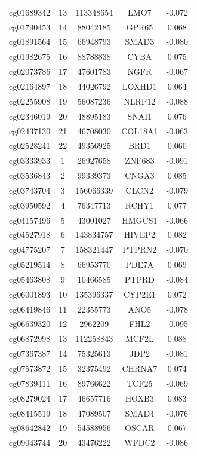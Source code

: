 \documentclass[12pt,a4paper]{article}
\begin{document}
\begin{longtable}{|c|c|c|c|c|}
		cg01689342 & 13 & 113348654 & LMO7 & -0.072 \\
		cg01790453 & 14 & 88042185 & GPR65 & 0.068 \\
		cg01891564 & 15 & 66948793 & SMAD3 & -0.080 \\
		cg01982675 & 16 & 88788838 & CYBA & 0.075 \\
		cg02073786 & 17 & 47601783 & NGFR & -0.067 \\
		cg02164897 & 18 & 44026792 & LOXHD1 & 0.064 \\
		cg02255908 & 19 & 56087236 & NLRP12 & -0.088 \\
		cg02346019 & 20 & 48895183 & SNAI1 & 0.076 \\
		cg02437130 & 21 & 46708030 & COL18A1 & -0.063 \\
		cg02528241 & 22 & 49356925 & BRD1 & 0.060 \\
		cg03333933 & 1 & 26927658 & ZNF683 & -0.091 \\
		cg03536843 & 2 & 99339373 & CNGA3 & 0.085 \\
		cg03743704 & 3 & 156066339 & CLCN2 & -0.079 \\
		cg03950592 & 4 & 76347713 & RCHY1 & 0.077 \\
		cg04157496 & 5 & 43001027 & HMGCS1 & -0.066 \\
		cg04527918 & 6 & 143834757 & HIVEP2 & 0.082 \\
		cg04775207 & 7 & 158321447 & PTPRN2 & -0.070 \\
		cg05219514 & 8 & 66953770 & PDE7A & 0.069 \\
		cg05463808 & 9 & 10466585 & PTPRD & -0.084 \\
		cg06001893 & 10 & 135396337 & CYP2E1 & 0.072 \\
		cg06419846 & 11 & 22355773 & ANO5 & -0.078 \\
		cg06639320 & 12 & 2962209 & FHL2 & -0.095 \\
		cg06872998 & 13 & 112258843 & MCF2L & 0.088 \\
		cg07367387 & 14 & 75325613 & JDP2 & -0.081 \\
		cg07573872 & 15 & 32375492 & CHRNA7 & 0.074 \\
		cg07839411 & 16 & 89766622 & TCF25 & -0.069 \\
		cg08279024 & 17 & 46657716 & HOXB3 & 0.083 \\
		cg08415519 & 18 & 47089507 & SMAD4 & -0.076 \\
		cg08642842 & 19 & 54588956 & OSCAR & 0.067 \\
		cg09043744 & 20 & 43476222 & WFDC2 & -0.086 \\

\end{longtable}
\end{document}
